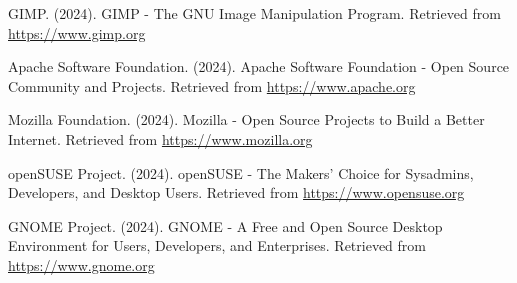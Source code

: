 \documentclass[12pt,a4paper]{article}
\begin{document}
\begin{thebibliography}{20}
 GIMP. (2024). GIMP - The GNU Image Manipulation Program. Retrieved from \url{https://www.gimp.org}

 Apache Software Foundation. (2024). Apache Software Foundation - Open Source Community and Projects. Retrieved from \url{https://www.apache.org}

 Mozilla Foundation. (2024). Mozilla - Open Source Projects to Build a Better Internet. Retrieved from \url{https://www.mozilla.org}

 openSUSE Project. (2024). openSUSE - The Makers' Choice for Sysadmins, Developers, and Desktop Users. Retrieved from \url{https://www.opensuse.org}

 GNOME Project. (2024). GNOME - A Free and Open Source Desktop Environment for Users, Developers, and Enterprises. Retrieved from \url{https://www.gnome.org}

\end{thebibliography}
\end{document}
